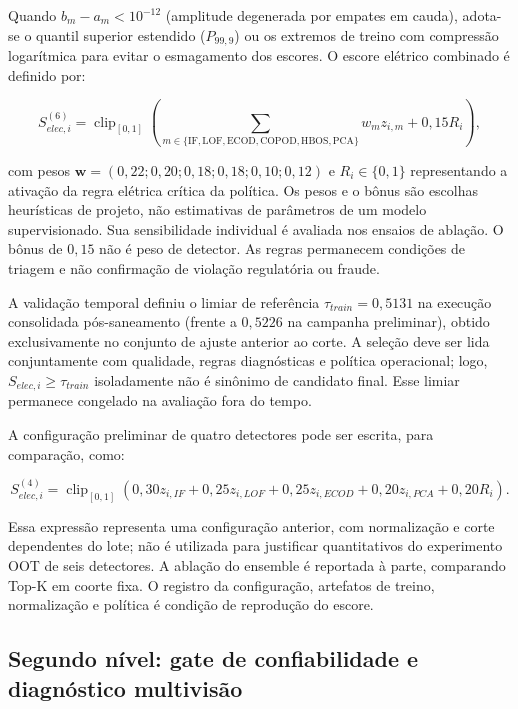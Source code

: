 Quando \(b_m-a_m<10^{-12}\) (amplitude degenerada por empates em cauda), adota-se o quantil superior estendido ($P_{99,9}$) ou os extremos de treino com compressão logarítmica para evitar o esmagamento dos escores. O escore elétrico combinado é definido por:

\[S_{elec,i}^{(6)}=\operatorname{clip}_{[0,1]}\!\left(\sum_{m\in\{\mathrm{IF},\mathrm{LOF},\mathrm{ECOD},\mathrm{COPOD},\mathrm{HBOS},\mathrm{PCA}\}}w_mz_{i,m}+0{,}15R_i\right),\]

com pesos \(\mathbf w=(0{,}22;0{,}20;0{,}18;0{,}18;0{,}10;0{,}12)\) e \(R_i\in\{0,1\}\) representando a ativação da regra elétrica crítica da política. Os pesos e o bônus são escolhas heurísticas de projeto, não estimativas de parâmetros de um modelo supervisionado. Sua sensibilidade individual é avaliada nos ensaios de ablação. O bônus de \(0{,}15\) não é peso de detector. As regras permanecem condições de triagem e não confirmação de violação regulatória ou fraude.

A validação temporal definiu o limiar de referência \(\tau_{train}=0{,}5131\) na execução consolidada pós-saneamento (frente a \(0{,}5226\) na campanha preliminar), obtido exclusivamente no conjunto de ajuste anterior ao corte. A seleção deve ser lida conjuntamente com qualidade, regras diagnósticas e política operacional; logo, \(S_{elec,i}\ge\tau_{train}\) isoladamente não é sinônimo de candidato final. Esse limiar permanece congelado na avaliação fora do tempo.

A configuração preliminar de quatro detectores pode ser escrita, para comparação, como:

\[S_{elec,i}^{(4)}=\operatorname{clip}_{[0,1]}\!\left(0{,}30z_{i,IF}+0{,}25z_{i,LOF}+0{,}25z_{i,ECOD}+0{,}20z_{i,PCA}+0{,}20R_i\right).\]

Essa expressão representa uma configuração anterior, com normalização e corte dependentes do lote; não é utilizada para justificar quantitativos do experimento OOT de seis detectores. A ablação do ensemble é reportada à parte, comparando Top-K em coorte fixa. O registro da configuração, artefatos de treino, normalização e política é condição de reprodução do escore.

\subsection{Segundo nível: gate de confiabilidade e diagnóstico multivisão}\label{segundo-nuxedvel-gate-de-confiabilidade-e-diagnuxf3stico-multivisuxe3o}

